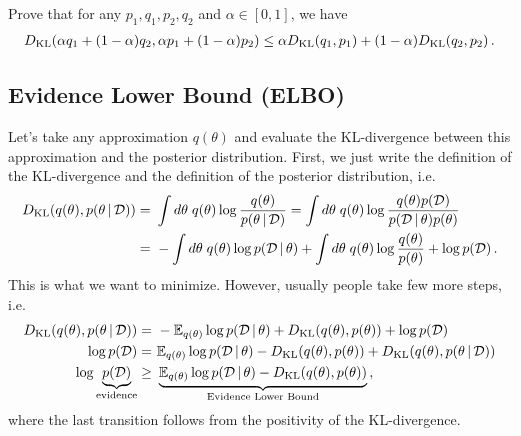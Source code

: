 \begin{exercise}
    Prove that for any $p_1,q_1,p_2,q_2$ and $\alpha \in [0,1]$, we have
    \begin{align}
        D_{\mathrm{KL}}(\alpha q_1 + (1-\alpha)q_2,\alpha p_1 + (1-\alpha)p_2) \leq \alpha D_{\mathrm{KL}}(q_1,p_1) + (1-\alpha)D_{\mathrm{KL}}(q_2,p_2)\,.
    \end{align}
\end{exercise}

\subsection{Evidence Lower Bound (ELBO)}
Let's take any approximation $q(\theta)$ and evaluate the KL-divergence between this approximation and the posterior distribution.
First, we just write the definition of the KL-divergence and the definition of the posterior distribution, i.e.
\begin{align}
    D_{\mathrm{KL}}(q(\theta),p(\theta\,|\, \mathcal{D})) =~& \int d\theta\; q(\theta)\log\frac{q(\theta)}{p(\theta\,|\, \mathcal{D})} = \int d\theta\; q(\theta)\log\frac{q(\theta)p(\mathcal{D})}{p(\mathcal{D}\,|\, \theta)p(\theta)}\\
    =~& - \int d\theta\;q(\theta) \log p(\mathcal{D}\,|\, \theta) + \int d\theta\; q(\theta)\log\frac{q(\theta)}{p(\theta)} + \log p(\mathcal{D})\,.
\end{align}
This is what we want to minimize. 
However, usually people take few more steps, i.e.
\begin{align}
    D_{\mathrm{KL}}(q(\theta),p(\theta\,|\, \mathcal{D})) =~& - \mathbb{E}_{q(\theta)} \log p(\mathcal{D}\,|\, \theta) + D_{\mathrm{KL}}(q(\theta),p(\theta))  + \log p(\mathcal{D})\\
    \log p(\mathcal{D}) =~&  \mathbb{E}_{q(\theta)} \log p(\mathcal{D}\,|\, \theta) -D_{\mathrm{KL}}(q(\theta),p(\theta)) + D_{\mathrm{KL}}(q(\theta),p(\theta\,|\, \mathcal{D}))\label{eq:evidence}\\
    \log \underbrace{p(\mathcal{D})}_{\text{evidence}} \geq~& \underbrace{\mathbb{E}_{q(\theta)} \log p(\mathcal{D}\,|\, \theta) -D_{\mathrm{KL}}(q(\theta),p(\theta))}_{\text{Evidence Lower Bound}}\,,
\end{align}
where the last transition follows from the positivity of the KL-divergence.


